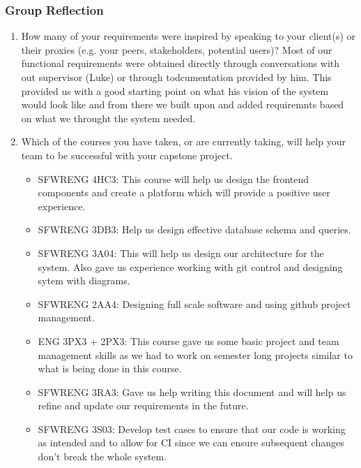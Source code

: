 \subsubsection*{Group Reflection}
\begin{enumerate}
  \item How many of your requirements were inspired by speaking to your client(s) or their proxies (e.g. your peers, stakeholders, potential users)?
  Most of our functional requirements were obtained directly through conversations with out supervisor (Luke) or through todcumentation provided by him. This provided us with a good starting point on what his vision of the system would look like and from there we built upon and added requiremnts based on what we throught the system needed.

  \item Which of the courses you have taken, or are currently taking, will help your team to be successful with your capstone project.
  \begin{itemize}
      \item SFWRENG 4HC3: This course will help us design the frontend components and create a platform which will provide a positive user experience.
      \item SFWRENG 3DB3: Help us design effective database schema and queries.
      \item SFWRENG 3A04: This will help us design our architecture for the system. Also gave us experience working with git control and designing sytem with diagrams.
      \item SFWRENG 2AA4: Designing full scale software and using github project management.
      \item ENG 3PX3 + 2PX3: This course gave us some basic project and team management skills as we had to work on semester long projects similar to what is being done in this course.
      \item SFWRENG 3RA3: Gave us help writing this document and will help us refine and update our requirements in the future.
      \item SFWRENG 3S03: Develop test cases to ensure that our code is working as intended and to allow for CI since we can ensure subsequent changes don't break the whole system.
  \end{itemize}


\end{enumerate}
